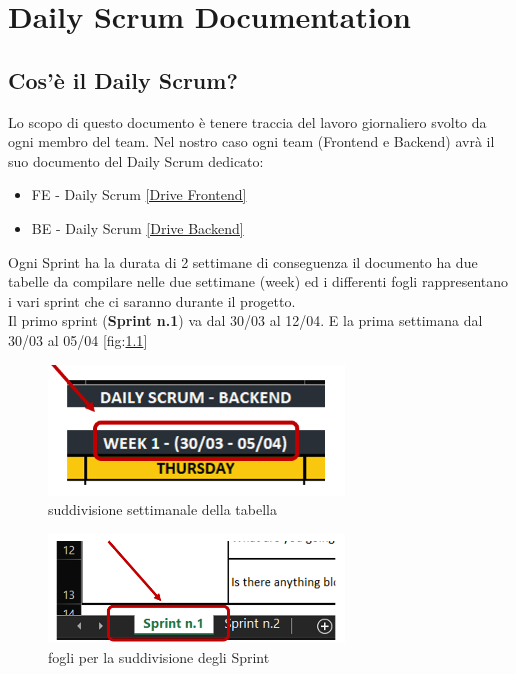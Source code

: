 \chapter{Daily Scrum Documentation}
\label{chap:dailyscrum}
\section{Cos'è il Daily Scrum?}
Lo scopo di questo documento è tenere traccia del lavoro giornaliero svolto da ogni membro del team. Nel nostro caso ogni team (Frontend e Backend) avrà il suo documento del Daily Scrum dedicato:
\begin{itemize}
    \item FE - Daily Scrum \href{https://studentiunimol-my.sharepoint.com/:x:/r/personal/a_daguanno1_studenti_unimol_it/_layouts/15/Doc.aspx?sourcedoc=\%7BC6890990-B5A6-4D9F-9306-993B687826C0\%7D&file=FE\%20-\%20Daily\%20Scrum.xlsx&action=default&mobileredirect=true}{[Drive Frontend]}
    \item BE - Daily Scrum \href{https://studentiunimol-my.sharepoint.com/:x:/r/personal/a_daguanno1_studenti_unimol_it/_layouts/15/Doc.aspx?sourcedoc=\%7BDC32CDAD-D25E-4F03-9490-1BA4A0895567\%7D&file=BE\%20-\%20Daily\%20Scrum.xlsx&action=default&mobileredirect=true}{[Drive Backend]}
\end{itemize}

Ogni Sprint ha la durata di 2 settimane di conseguenza il documento ha due tabelle da compilare nelle due settimane (week) ed i differenti fogli rappresentano i vari sprint che ci saranno durante il progetto.\\
Il primo sprint (\textbf{Sprint n.1}) va dal 30/03 al 12/04. E la prima settimana dal 30/03 al 05/04 \small{[fig:\ref{fig:week}]}

\begin{figure}[ht]
    \centering
\includegraphics[width=0.7\textwidth]{Learning/09_ReadME_Documentazione/1_DailyScrumDoc/img_DSD/Immagine 2022-04-01 222626.png}
    \caption{suddivisione settimanale della tabella}
    \label{fig:week}
    \end{figure}
\FloatBarrier
\begin{figure}[ht]
    \centering
\includegraphics[width=0.7\textwidth]{Learning/09_ReadME_Documentazione/1_DailyScrumDoc/img_DSD/Immagine 2022-04-01 223141.png}
    \caption{fogli per la suddivisione degli Sprint}
    \label{fig:scrum}
    \end{figure}
\FloatBarrier

